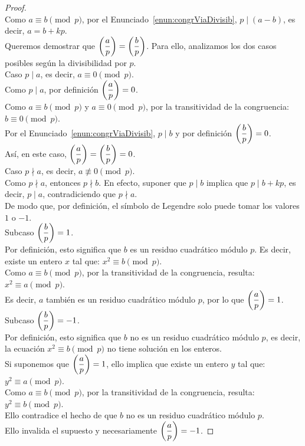 \begin{proof} \, \\
Como $a\equiv b \pmod p$, por el Enunciado~\ref{enun:congrViaDivisib}, $p \mid (a-b)$, es decir, $a=b+kp$. \\ 
Queremos demostrar que $\left(\dfrac{a}{p}\right) =\left(\dfrac{b}{p}\right)$. Para ello, analizamos los dos casos posibles según la divisibilidad por $p$. \\
Caso $p \mid a$, es decir, $a \equiv 0 \pmod p$. \\
Como $p \mid a$, por definición $\left(\dfrac{a}{p}\right)=0$. \\
Como $a \equiv b \pmod p$ y $a \equiv 0 \pmod p$, por la transitividad de la congruencia: $b\equiv 0 \pmod p$. \\
Por el Enunciado~\ref{enun:congrViaDivisib}, $p \mid b$ y por definición $\left(\dfrac{b}{p}\right)=0$. \\
Así, en este caso, $\left(\dfrac{a}{p}\right) =\left(\dfrac{b}{p}\right) = 0$. \\
Caso $p \nmid a$, es decir, $a \nequiv 0 \pmod p$. \\
Como $p \nmid a$, entonces $p \nmid b$. En efecto, suponer que $p \mid b$ implica que $p \mid b + kp$, es decir, $p \mid a$, contradiciendo que $p \nmid a$. \\
De modo que, por definición, el símbolo de Legendre solo puede tomar los valores $1$ o $-1$. \\
Subcaso $\left(\dfrac{b}{p}\right) = 1$. \\
Por definición, esto significa que $b$ es un residuo cuadrático módulo $p$. Es decir, existe un entero $x$ tal que: $x^{2}\equiv b \pmod p$. \\
Como $a \equiv b \pmod p$, por la transitividad de la congruencia, resulta: $x^{2}\equiv a \pmod p$. \\
Es decir, $a$ también es un residuo cuadrático módulo $p$, por lo que $\left(\dfrac{a}{p}\right) = 1$. \\
Subcaso $\left(\dfrac{b}{p}\right) = -1$. \\
Por definición, esto significa que $b$ no es un residuo cuadrático módulo $p$, es decir, la ecuación $x^2 \equiv b \pmod p$ no tiene solución en los enteros. \\
Si suponemos que $\left(\dfrac{a}{p}\right) = 1$, ello implica que existe un entero $y$ tal que: $y^2 \equiv a \pmod p$. \\
Como $a \equiv b \pmod p$, por la transitividad de la congruencia, resulta: $y^2 \equiv b \pmod p$. \\
Ello contradice el hecho de que $b$ no es un residuo cuadrático módulo $p$. \\
Ello invalida el supuesto y necesariamente $\left(\dfrac{a}{p}\right) = -1$.
\end{proof}


